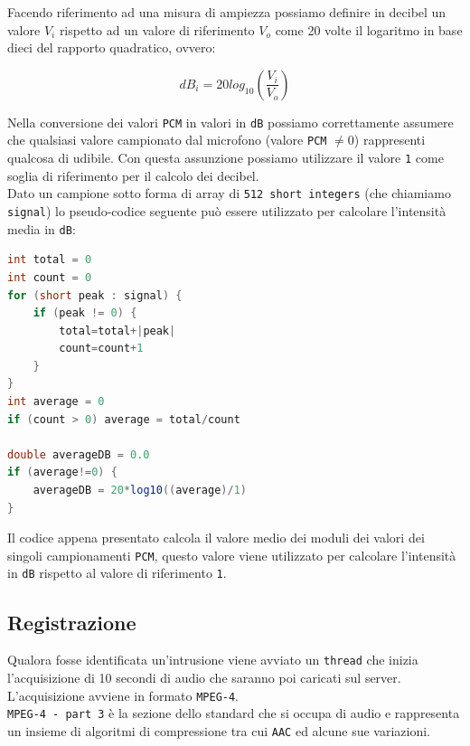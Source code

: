 Facendo riferimento ad una misura di ampiezza possiamo definire in decibel un valore $V_i$ rispetto ad un valore di riferimento $V_o$ come 20 volte il logaritmo in base dieci del rapporto quadratico, ovvero:

\begin{equation}
dB_i = 20log_{10} \left(\frac{V_i}{V_o}\right)
\end{equation}

Nella conversione dei valori \texttt{PCM} in valori in \texttt{dB} possiamo correttamente assumere che qualsiasi valore campionato dal microfono (valore \texttt{PCM} $\neq 0$) rappresenti qualcosa di udibile. Con questa assunzione possiamo utilizzare il valore \texttt{1} come soglia di riferimento per il calcolo dei decibel.\\

Dato un campione sotto forma di array di \texttt{512 short integers} (che chiamiamo \texttt{signal}) lo pseudo-codice seguente può essere utilizzato per calcolare l'intensità media in \texttt{dB}:

\begin{lstlisting}[language=Java, caption=Pseudo-codice per calcolare i valori in decibel da campionamento PCM]
int total = 0
int count = 0
for (short peak : signal) {
	if (peak != 0) {
		total=total+|peak|
		count=count+1
	}
}
int average = 0
if (count > 0) average = total/count

double averageDB = 0.0
if (average!=0) {
	averageDB = 20*log10((average)/1)
}
\end{lstlisting}

Il codice appena presentato calcola il valore medio dei moduli dei valori dei singoli campionamenti \texttt{PCM}, questo valore viene utilizzato per calcolare l'intensità in \texttt{dB} rispetto al valore di riferimento \texttt{1}.

\subsection{Registrazione}
Qualora fosse identificata un'intrusione viene avviato un \texttt{thread} che inizia l'acquisizione di 10 secondi di audio che saranno poi caricati sul server.\\

L'acquisizione avviene in formato \texttt{MPEG-4}.\\

\texttt{MPEG-4 - part 3} è la sezione dello standard che si occupa di audio e rappresenta un insieme di algoritmi di compressione tra cui \texttt{AAC} ed alcune sue variazioni.\\

